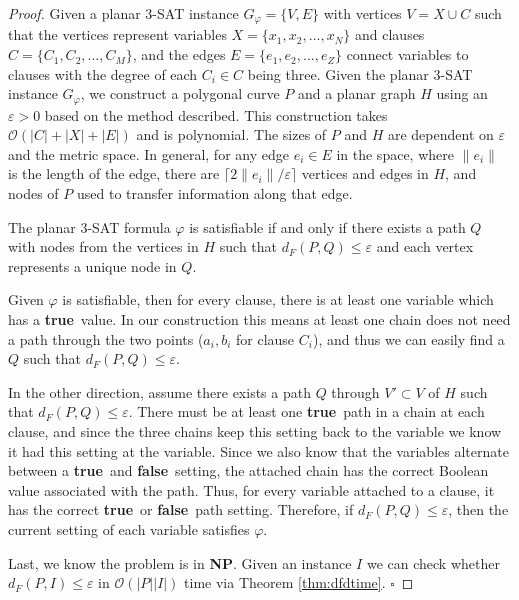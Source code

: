 \documentclass{article}[11pt]
\newcommand{\dfre}{d_F}
\newcommand{\BO}{\mathcal{O}}
\newcommand{\true}{\textbf{true}}
\newcommand{\false}{\textbf{false}}
\begin{document}
\begin{proof}
    Given a planar 3-SAT instance $G_{\varphi}=\{V,E\}$ with vertices $V=X \cup C$ such that the vertices represent 
    variables $X=\{x_1,x_2,\dots,x_N\}$ and clauses $C=\{C_1,C_2,...,C_M\}$, and the edges $E=\{e_1,e_2,\dots,e_Z\}$ 
    connect variables to clauses with the degree of each $C_i \in C$ being three.
    Given the planar 3-SAT instance $G_{\varphi}$,  
    we construct a polygonal curve $P$ and a planar graph $H$ using an $\varepsilon > 0$ based on the method described. 
    This construction takes $\BO(|C|+|X|+|E|)$ and is polynomial.
    The sizes of $P$ and $H$ are dependent on $\varepsilon$ and the metric space.  
    In general, for any edge $e_i \in E$ in the space, where $\lVert e_i \rVert$ is the length of the edge, there are 
    $\lceil 2\lVert e_i \rVert/\varepsilon \rceil$ vertices and edges in $H$, and nodes of $P$ used to transfer information
    along that edge.
    
    The planar 3-SAT formula $\varphi$ is satisfiable if and only if there exists a path $Q$ with nodes
    from the vertices in $H$ such that $\dfre(P,Q) \leq \varepsilon$ and each vertex represents a unique node in $Q$.
    
    Given $\varphi$ is satisfiable, then for every clause, there is at least one variable which has a \true\
    value. In our construction this means at least one chain does not need a path through the two points ($a_i,b_i$ for clause $C_i$),
    and thus we can easily find a $Q$ such that $\dfre(P,Q) \leq \varepsilon$.
    


    In the other direction, assume there exists a path $Q$ through $V' \subset V$ of $H$ such that $\dfre(P,Q) \leq \varepsilon$.
    There must be at least one \true\ path in a chain at each clause, and since the three chains keep this setting back to
    the variable we know it had this setting at the variable.  Since we also know that the variables
    alternate between a \true\ and \false\ setting, the attached chain has the correct Boolean value associated with the path.  
    Thus, for every variable attached to a clause, it has the correct \true\ or \false\ path setting.  
    Therefore, if $\dfre(P,Q) \leq \varepsilon$, then the current setting of each variable satisfies $\varphi$. 
    


    Last, we know the problem is in \textbf{NP}.  Given an instance $I$ we can check whether $\dfre(P,I) \leq \varepsilon$
    in $\BO(|P||I|)$ time via Theorem \ref{thm:dfdtime}.
    \hfill $\square$
\end{proof}
\end{document}
